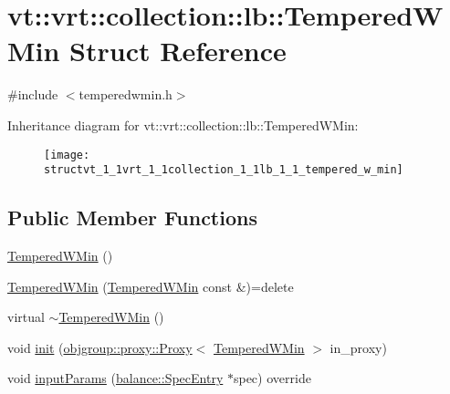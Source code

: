 \hypertarget{structvt_1_1vrt_1_1collection_1_1lb_1_1_tempered_w_min}{}\section{vt\+:\+:vrt\+:\+:collection\+:\+:lb\+:\+:Tempered\+W\+Min Struct Reference}
\label{structvt_1_1vrt_1_1collection_1_1lb_1_1_tempered_w_min}


{\ttfamily \#include $<$temperedwmin.\+h$>$}

Inheritance diagram for vt\+:\+:vrt\+:\+:collection\+:\+:lb\+:\+:Tempered\+W\+Min\+:\begin{figure}[H]
\begin{center}
\leavevmode
\texttt{[image: structvt\_1\_1vrt\_1\_1collection\_1\_1lb\_1\_1\_tempered\_w\_min]}
\end{center}
\end{figure}
\subsection*{Public Member Functions}
\begin{DoxyCompactItemize}
\item 
\hyperlink{structvt_1_1vrt_1_1collection_1_1lb_1_1_tempered_w_min_a0651609fa1544383a93ef8c178be4780}{Tempered\+W\+Min} ()
\item 
\hyperlink{structvt_1_1vrt_1_1collection_1_1lb_1_1_tempered_w_min_a757b4b20c43d657d4ceba856c3da13ee}{Tempered\+W\+Min} (\hyperlink{structvt_1_1vrt_1_1collection_1_1lb_1_1_tempered_w_min}{Tempered\+W\+Min} const \&)=delete
\item 
virtual \hyperlink{structvt_1_1vrt_1_1collection_1_1lb_1_1_tempered_w_min_a7225191709849520f021c6a5df9f26ba}{$\sim$\+Tempered\+W\+Min} ()
\item 
void \hyperlink{structvt_1_1vrt_1_1collection_1_1lb_1_1_tempered_w_min_a4568be2f1baa683968308e48a0743dea}{init} (\hyperlink{structvt_1_1objgroup_1_1proxy_1_1_proxy}{objgroup\+::proxy\+::\+Proxy}$<$ \hyperlink{structvt_1_1vrt_1_1collection_1_1lb_1_1_tempered_w_min}{Tempered\+W\+Min} $>$ in\+\_\+proxy)
\item 
void \hyperlink{structvt_1_1vrt_1_1collection_1_1lb_1_1_tempered_w_min_acac5be655a5286211177c83e5379efae}{input\+Params} (\hyperlink{structvt_1_1vrt_1_1collection_1_1balance_1_1_spec_entry}{balance\+::\+Spec\+Entry} $\ast$spec) override
\end{DoxyCompactItemize}
